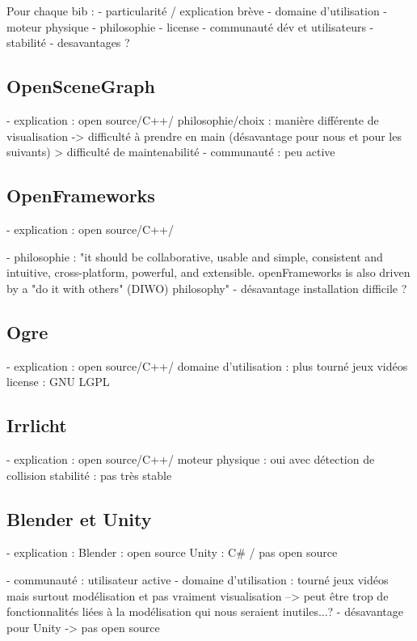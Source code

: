 Pour chaque bib : 
- particularité / explication brève
- domaine d'utilisation
- moteur physique 
- philosophie
- license
- communauté dév et utilisateurs
- stabilité
- desavantages ?

\subsection{OpenSceneGraph}
- explication : open source/C++/
philosophie/choix :  manière différente de visualisation -> difficulté à prendre en main (désavantage pour nous et pour les suivants) > difficulté de maintenabilité
- communauté : peu active

\subsection{OpenFrameworks}
- explication : open source/C++/

- philosophie : "it should be collaborative, usable and simple, consistent and intuitive, cross-platform, powerful, and extensible. openFrameworks is also driven by a "do it with others" (DIWO) philosophy"
- désavantage installation difficile ?


\subsection{Ogre}
- explication : open source/C++/
domaine d'utilisation :  plus tourné jeux vidéos 
license : GNU LGPL \\

\subsection{Irrlicht}
- explication : open source/C++/
moteur physique : oui avec détection de collision
stabilité : pas très stable 

\subsection{Blender et Unity}
- explication : Blender : open source
				Unity : C# / pas open source
				
- communauté  : utilisateur active
- domaine d'utilisation : tourné jeux vidéos mais surtout modélisation et pas vraiment visualisation
--> peut être trop de fonctionnalités liées à la modélisation qui nous seraient inutiles...?
- désavantage pour Unity -> pas open source

